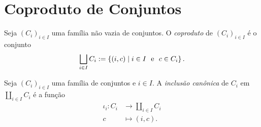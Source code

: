 




\section{Coproduto de Conjuntos}

\begin{defi}
Seja $(C_i)_{i \in I}$ uma família não vazia de conjuntos. O \emph{coproduto} de $(C_i)_{i \in I}$ é o conjunto
	\begin{equation*}
	\bigsqcup_{i \in I} C_i :=\left\{(i,c) \;\middle\vert\; i \in I \text{\ \ e\ \ } c \in C_i \right\}.
	\end{equation*}
\end{defi}

\begin{defi}
Seja $(C_i)_{i \in I}$ uma família de conjuntos e $i \in I$. A \emph{inclusão canônica} de $C_i$ em $\coprod_{i \in I} C_i$ é a função
	\begin{align*}
	\iota_i: C_i &\to \coprod_{i \in I} C_i \\
			c &\mapsto (i,c).
	\end{align*}
\end{defi}

